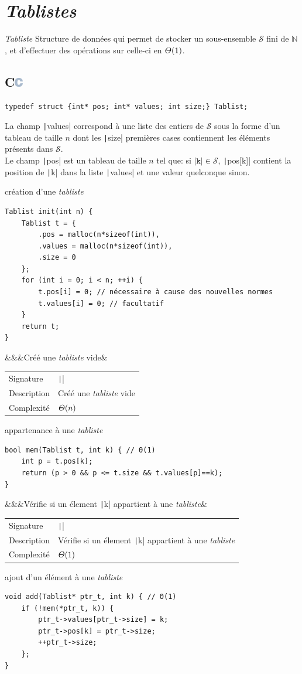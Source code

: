 \documentclass[a4paper,12pt,titlepage]{article}
\renewcommand{\c}{\subsection[C]{C\hfill\protect\includegraphics[height=11pt]{C}}}
\let\oldsection\section
\renewcommand\section{\clearpage\oldsection}
\let\oldleft\left
\renewcommand{\left}{\mathopen{}\mathclose\bgroup\oldleft}
\let\oldright\right
\renewcommand{\right}{\aftergroup\egroup\oldright}
\newcommand{\Th}[1]{\ensuremath{\varTheta\left(#1\right)}}
\newcommand{\info}[4][]{\def\argI{}\ifx&#2&\else\def\argI{Signature&\texttt|#2|\\}\fi\def\argII{}\ifx&#3&\else\def\argII{Description&#3\\}\fi\begin{tabularx}{\textwidth}{AB}\argI\argII Complexité&#4#1\end{tabularx}}
\begin{document}
\section{\emph{Tablistes}}
\begin{df*}{\emph{Tabliste}}
Structure de données qui permet de stocker un sous-ensemble $\mathcal{S}$ fini de $\mathbb{N}$, et d'effectuer des opérations sur celle-ci en \Th{1}.
\end{df*}
\c
\begin{tp*}{}
\begin{verbatim}
typedef struct {int* pos; int* values; int size;} Tablist;
\end{verbatim}
La champ \texttt|values| correspond à une liste des entiers de $\mathcal{S}$ sous la forme d'un tableau de taille $n$ dont les \texttt|size| premières cases contiennent les éléments présents dans $\mathcal{S}$.\\Le champ \texttt|pos| est un tableau de taille $n$ tel que: si $\mathtt{\texttt|k|}\in\mathcal{S}$, \texttt|pos[k]| contient la position de \texttt|k| dans la liste \texttt|values| et une valeur quelconque sinon.
\end{tp*}
\begin{fnc*}{création d'une \emph{tabliste}}
\begin{verbatim}
Tablist init(int n) {
    Tablist t = {
        .pos = malloc(n*sizeof(int)),
        .values = malloc(n*sizeof(int)),
        .size = 0
    };
    for (int i = 0; i < n; ++i) {
        t.pos[i] = 0; // nécessaire à cause des nouvelles normes
        t.values[i] = 0; // facultatif
    }
    return t;
}
\end{verbatim}
\info{}{Créé une \emph{tabliste} vide}{\Th{n}}
\end{fnc*}
\begin{fnc*}{appartenance à une \emph{tabliste}}
\begin{verbatim}
bool mem(Tablist t, int k) { // Θ(1)
    int p = t.pos[k];
    return (p > 0 && p <= t.size && t.values[p]==k);
}
\end{verbatim}
\info{}{Vérifie si un élement \texttt|k| appartient à une \emph{tabliste}}{\Th{1}}
\end{fnc*}
\begin{fnc*}{ajout d'un élément à une \emph{tabliste}}
\begin{verbatim}
void add(Tablist* ptr_t, int k) { // Θ(1)
    if (!mem(*ptr_t, k)) {
        ptr_t->values[ptr_t->size] = k;
        ptr_t->pos[k] = ptr_t->size;
        ++ptr_t->size;
    };
}
\end{verbatim}
\end{fnc*}
\end{document}

